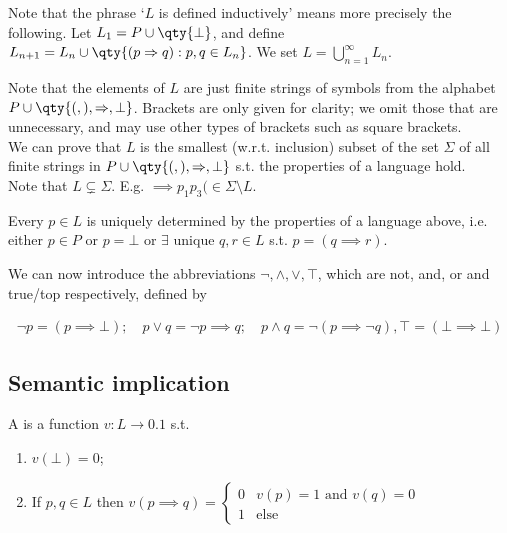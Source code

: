 \begin{remark}
    Note that the phrase `$L$ is defined inductively' means more precisely the following.
    Let $L_1 = P \cup \qty{\bot}$, and define $L_{n+1} = L_n \cup \qty{(p \implies q) : p, q \in L_n}$.
    We set $L = \bigcup_{n=1}^\infty L_n$.

    Note that the elements of $L$ are just finite strings of symbols from the alphabet $P \cup \qty{(, ), \implies, \bot}$.
    Brackets are only given for clarity; we omit those that are unnecessary, and may use other types of brackets such as square brackets. \\
    We can prove that $L$ is the smallest (w.r.t. inclusion) subset of the set $\Sigma$ of all finite strings in $P \cup \qty{(, ), \implies, \bot}$ s.t. the properties of a language hold. \\
    Note that $L \subsetneq \Sigma$. E.g. $\implies p_1 p_3 ( \in \Sigma \setminus L$.


    Every $p \in L$ is uniquely determined by the properties of a language above, i.e. either $p \in P$ or $p = \bot$ or $\exists$ unique $q, r \in L$ s.t. $p = (q \implies r)$.
\end{remark}

We can now introduce the abbreviations $\neg, \wedge, \vee, \top$, which are not, and, or and true/top respectively, defined by
\begin{notation}
    \begin{align*}
        \neg p = (p \implies \bot);\quad p \vee q = \neg p \implies q;\quad p \wedge q = \neg (p \implies \neg q), \top = (\bot \implies \bot)
    \end{align*}
\end{notation}

\subsection{Semantic implication}
\begin{definition}[Valuation]
    A  is a function $v \colon L \to \qty{0,1}$ s.t.
    \begin{enumerate}
        \item $v(\bot) = 0$;
        \item If $p, q \in L$ then
        $v(p \implies q) = \begin{cases}
            0 & v(p) = 1 \text{ and } v(q) = 0 \\
            1 & \text{else}
        \end{cases}$
    \end{enumerate}
\end{definition}

